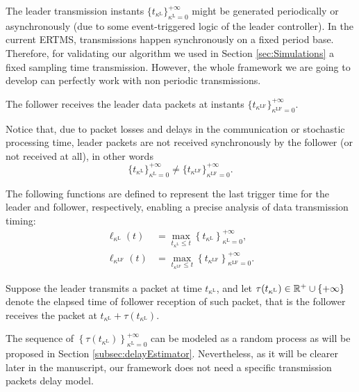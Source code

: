 The leader transmission instants \(\{ t_{\kappa^\mathrm{L}} \}_{\kappa^\mathrm{L}=0}^{+\infty}\) might be generated periodically or asynchronously (due to some event-triggered logic of the leader controller). In the current ERTMS, transmissions happen synchronously on a fixed period base. Therefore, for validating our algorithm we used in Section \ref{sec:Simulations} 
a fixed sampling time transmission. However, the whole framework we are going to develop can perfectly work with non periodic transmissions. 

The follower receives the leader data packets at instants  \(\{ t_{\kappa^\mathrm{LF}} \}_{\kappa^\mathrm{LF}=0}^{+\infty}\).

Notice that, due to packet losses and delays  in the communication or stochastic processing time, leader packets are not received synchronously by the follower (or not received at all), in other words
\[\{ t_{\kappa^\mathrm{L}} \}_{\kappa^\mathrm{L}=0}^{+\infty} \neq \{ t_{\kappa^\mathrm{LF}} \}_{\kappa^\mathrm{LF}=0}^{+\infty}.\]



The following functions are defined to represent the last trigger time for the leader and follower, respectively, enabling a precise analysis of data transmission timing:
\begin{align*}
	\ell_{\kappa^\mathrm{L}}(t) &= \max_{t_{\kappa^\mathrm{L}} \leq t} \left \{ t_{\kappa^\mathrm{L}} \right \}_{\kappa^\mathrm{L}=0}^{+\infty}, \\
	\ell_{\kappa^\mathrm{LF}}(t) &= \max_{t_{\kappa^\mathrm{LF}} \leq t} \left \{ t_{\kappa^\mathrm{LF}} \right \}_{\kappa^\mathrm{LF}=0}^{+\infty}.
\end{align*}


Suppose the leader transmits a packet at time $t_{\kappa^\mathrm{L}}$, and let $\tau(t_{\kappa^\mathrm{L}})\in \Bbb{R}^+ \cup \{+\infty\}$ denote the elapsed time of follower reception of such packet, that is the follower receives the packet at $t_{\kappa^\mathrm{L}} + \tau(t_{\kappa^\mathrm{L}})$. 


The sequence of $ \left\{ \tau(t_{\kappa^\mathrm{L}})\right\}_{\kappa^\mathrm{L}=0}^{+\infty}$ can be modeled as a random process as will be proposed in Section \ref{subsec:delayEstimator}. Nevertheless, as it will be clearer later in the manuscript, our framework does not need a specific transmission packets delay model.










